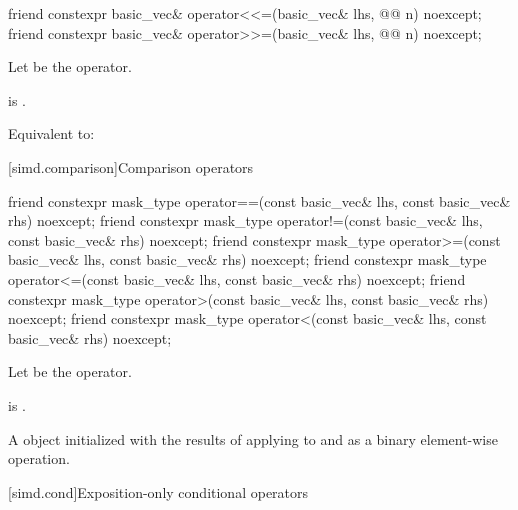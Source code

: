 \begin{itemdecl}
friend constexpr basic_vec& operator<<=(basic_vec& lhs, @@ n) noexcept;
friend constexpr basic_vec& operator>>=(basic_vec& lhs, @@ n) noexcept;
\end{itemdecl}

\begin{itemdescr}
\pnum
Let  be the operator.

\pnum
\constraints
{} is .

\pnum
\effects
Equivalent to: 
\end{itemdescr}

[simd.comparison]{Comparison operators}

\begin{itemdecl}
friend constexpr mask_type operator==(const basic_vec& lhs, const basic_vec& rhs) noexcept;
friend constexpr mask_type operator!=(const basic_vec& lhs, const basic_vec& rhs) noexcept;
friend constexpr mask_type operator>=(const basic_vec& lhs, const basic_vec& rhs) noexcept;
friend constexpr mask_type operator<=(const basic_vec& lhs, const basic_vec& rhs) noexcept;
friend constexpr mask_type operator>(const basic_vec& lhs, const basic_vec& rhs) noexcept;
friend constexpr mask_type operator<(const basic_vec& lhs, const basic_vec& rhs) noexcept;
\end{itemdecl}

\begin{itemdescr}
\pnum
Let  be the operator.

\pnum
\constraints
{} is
.

\pnum
\returns
A  object initialized with the results of applying
 to  and  as a binary element-wise
operation.
\end{itemdescr}

[simd.cond]{Exposition-only conditional operators}

